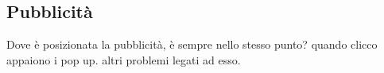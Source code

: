 \subsection{Pubblicità} \label{Pubblicità}
Dove è posizionata la pubblicità, è sempre nello stesso punto? quando clicco appaiono i pop up. altri problemi legati ad esso.